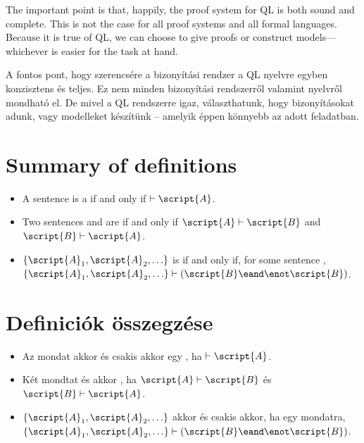 The important point is that, happily, the proof system for QL is both sound and complete. This is not the case for all proof systems and all formal languages. Because it is true of QL, we can choose to give proofs or construct models--- whichever is easier for the task at hand.

A fontos pont, hogy szerencsére a bizonyítási rendzer a QL nyelvre egyben konzisztens és teljes. Ez nem minden bizonyítási rendszerről valamint nyelvről mondható el. De mivel a QL rendszerre igaz, választhatunk, hogy bizonyításokat adunk, vagy modelleket készítünk -- amelyik éppen könnyebb az adott feladatban.

\section*{Summary of definitions}
\begin{itemize}
\item A sentence  is a  if and only if $\vdash\script{A}$.

\item Two sentences  and  are  if and only if $\script{A}\vdash\script{B}$ and $\script{B}\vdash\script{A}$.

\item $\{\script{A}_1,\script{A}_2,\ldots\}$ is  if and only if, for some sentence , $\{\script{A}_1,\script{A}_2,\ldots\}\vdash(\script{B} \eand \enot \script{B})$.
\end{itemize}

\section*{Definiciók összegzése}
\begin{itemize}
\item Az  mondat akkor és csakis akkor egy , ha $\vdash\script{A}$.

\item Két mondtat  és  akkor , ha $\script{A}\vdash\script{B}$ és $\script{B}\vdash\script{A}$.

\item $\{\script{A}_1,\script{A}_2,\ldots\}$  akkor és csakis akkor, ha egy  mondatra, $\{\script{A}_1,\script{A}_2,\ldots\}\vdash(\script{B} \eand \enot \script{B})$.
\end{itemize}

